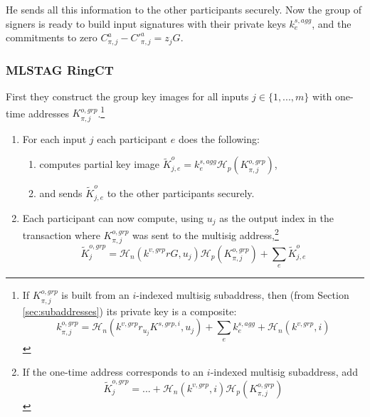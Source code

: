 He sends all this information to the other participants securely. Now the group of signers is ready to build input signatures with their private keys $k^{s,agg}_e$, and the commitments to zero $C^a_{\pi,j} - C'^a_{\pi,j} = z_j G$.

\subsubsection*{MLSTAG RingCT}

First they construct the group key images for all inputs $j \in \{1,...,m\}$ with one-time addresses $K^{o,grp}_{\pi,j}$.\footnote{If $K^{o,grp}_{\pi,j}$ is built from an $i$-indexed multisig subaddress, then (from Section \ref{sec:subaddresses}) its private key is a composite:
\[k^{o,grp}_{\pi,j} = \mathcal{H}_n(k^{v,grp} r_{u_j} K^{s,grp,i}, u_j) + \sum_e k^{s,agg}_e + \mathcal{H}_n(k^{v,grp},i)\]}
\begin{enumerate}
    \item For each input $j$ each participant $e$ does the following:
    \begin{enumerate}
        \item computes partial key image $\tilde{K}^{o}_{j,e} = k^{s,agg}_e \mathcal{H}_p(K^{o,grp}_{\pi,j})$,
        \item and sends $\tilde{K}^{o}_{j,e}$ to the other participants securely.
    \end{enumerate}
    \item Each participant can now compute, using $u_j$ as the output index in the transaction where $K^{o,grp}_{\pi,j}$ was sent to the multisig address,\footnote{If the one-time address corresponds to an $i$-indexed multisig subaddress, add
    \[\tilde{K}^{o,grp}_j = ... + \mathcal{H}_n(k^{v,grp},i) \mathcal{H}_p(K^{o,grp}_{\pi,j})\]}
    \[\tilde{K}^{o,grp}_j = \mathcal{H}_n(k^{v,grp} r G, u_j) \mathcal{H}_p(K^{o,grp}_{\pi,j}) + \sum_e \tilde{K}^{o}_{j,e}\]
\end{enumerate}

